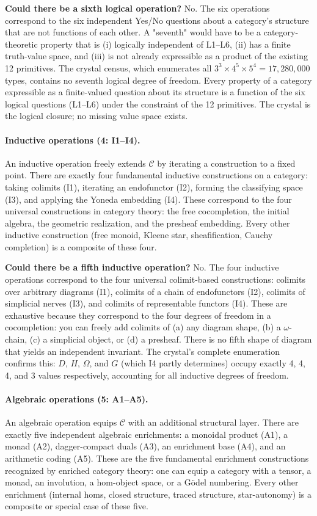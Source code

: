 \documentclass[12pt,a4paper]{article}
\begin{document}
\textbf{Could there be a sixth logical operation?} No. The six operations correspond to the six independent Yes/No questions about a category's structure that are not functions of each other. A "seventh" would have to be a category-theoretic property that is (i) logically independent of L1--L6, (ii) has a finite truth-value space, and (iii) is not already expressible as a product of the existing 12 primitives. The crystal census, which enumerates all $3^3 \times 4^5 \times 5^4 = 17{,}280{,}000$ types, contains no seventh logical degree of freedom. Every property of a category expressible as a finite-valued question about its structure is a function of the six logical questions (L1--L6) under the constraint of the 12 primitives. The crystal is the logical closure; no missing value space exists.

\paragraph{Inductive operations (4: I1--I4).}
An inductive operation freely extends $\mathcal{C}$ by iterating a construction to a fixed point. There are exactly four fundamental inductive constructions on a category: taking colimits (I1), iterating an endofunctor (I2), forming the classifying space (I3), and applying the Yoneda embedding (I4). These correspond to the four universal constructions in category theory: the free cocompletion, the initial algebra, the geometric realization, and the presheaf embedding. Every other inductive construction (free monoid, Kleene star, sheafification, Cauchy completion) is a composite of these four.

\textbf{Could there be a fifth inductive operation?} No. The four inductive operations correspond to the four universal colimit-based constructions: colimits over arbitrary diagrams (I1), colimits of a chain of endofunctors (I2), colimits of simplicial nerves (I3), and colimits of representable functors (I4). These are exhaustive because they correspond to the four degrees of freedom in a cocompletion: you can freely add colimits of (a) any diagram shape, (b) a $\omega$-chain, (c) a simplicial object, or (d) a presheaf. There is no fifth shape of diagram that yields an independent invariant. The crystal's complete enumeration confirms this: $D$, $H$, $\Omega$, and $G$ (which I4 partly determines) occupy exactly 4, 4, 4, and 3 values respectively, accounting for all inductive degrees of freedom.

\paragraph{Algebraic operations (5: A1--A5).}
An algebraic operation equips $\mathcal{C}$ with an additional structural layer. There are exactly five independent algebraic enrichments: a monoidal product (A1), a monad (A2), dagger-compact duals (A3), an enrichment base (A4), and an arithmetic coding (A5). These are the five fundamental enrichment constructions recognized by enriched category theory: one can equip a category with a tensor, a monad, an involution, a hom-object space, or a G\"odel numbering. Every other enrichment (internal homs, closed structure, traced structure, star-autonomy) is a composite or special case of these five.
\end{document}
